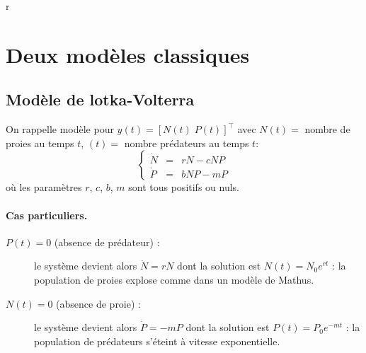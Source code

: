 r%
\section{Deux modèles classiques}


\subsection{Modèle de lotka-Volterra}

On rappelle modèle pour $y(t) = [N(t) \; P(t)]^\top$ avec $N(t) =$ nombre de proies au temps $t$, $(t) = $ nombre prédateurs au temps $t$:
$$
\left\{ \begin{array}{rcl} 
  \dot N & = & r N - c N P \\
  \dot P & = & b N P  - m P
\end{array} \right.
$$
où les paramètres $r$, $c$, $b$, $m$ sont tous positifs ou nuls.

\paragraph*{Cas particuliers.}
\begin{description}
  \item[$P(t) = 0 $ (absence de prédateur) :] le système devient alors $\dot N = r N$ dont la solution est $N(t) = N_0 e^{rt}$ : la population de proies explose comme dans un modèle de Mathus.
  \item[$N(t) = 0 $ (absence de proie) :] le système devient alors $\dot P = - m P$ dont la solution est $P(t) = P_0 e^{-mt}$ : la population de prédateurs s'éteint à vitesse exponentielle.
\end{description}

